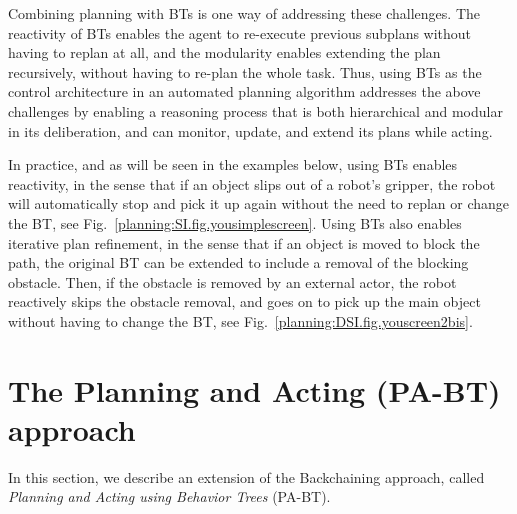 Combining planning with BTs is one way of addressing these challenges.
 The reactivity of BTs
enables the agent to re-execute previous subplans without having
to replan at all, and the modularity enables extending the plan
recursively, without having to re-plan the whole task. 
Thus, using BTs as the control architecture in an automated planning algorithm  addresses the above challenges by enabling a reasoning process that is both hierarchical and modular in its deliberation, and can monitor, update, and extend its plans while acting.

In practice, and as will be seen in the examples below,
using BTs enables reactivity, in the sense that if an object slips out of a robot's gripper, the robot will automatically stop and pick it up again without the need to replan or change the BT, see Fig.~\ref{planning:SI.fig.yousimplescreen}.
Using BTs also enables iterative plan refinement, in the sense that if an object is moved to block the path, the original BT can be extended to include a removal of the blocking obstacle. Then, if the obstacle is removed by an external actor, the robot reactively skips the obstacle removal, and goes on to pick up the main object without having to change the BT, see Fig.~\ref{planning:DSI.fig.youscreen2bis}. 



%
%

\section{The Planning and Acting (PA-BT) approach}
\label{planning.robotics}
In this section, we describe an extension of the Backchaining approach, called \emph{Planning and Acting using Behavior Trees} (PA-BT). 

